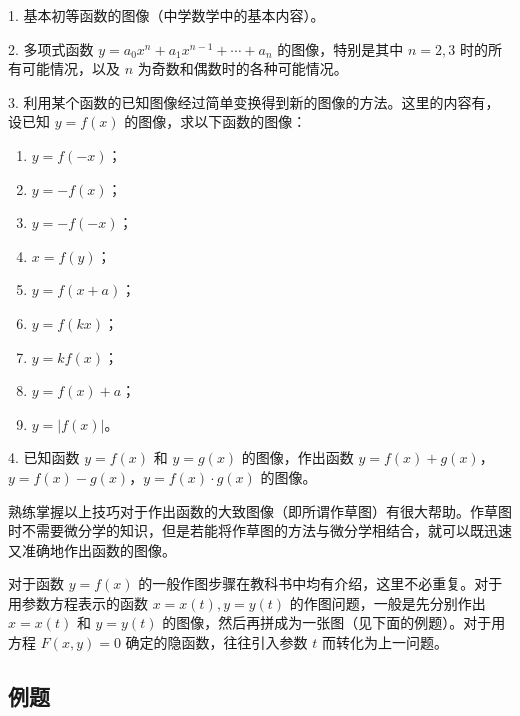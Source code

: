 1. 基本初等函数的图像（中学数学中的基本内容）。

2. 多项式函数 $y=a_0x^n+a_1x^{n-1}+\cdots+a_n$ 的图像，特别是其中 $n=2,3$ 时的所有可能情况，以及 $n$ 为奇数和偶数时的各种可能情况。

3. 利用某个函数的已知图像经过简单变换得到新的图像的方法。这里的内容有，设已知 $y=f(x)$ 的图像，求以下函数的图像：
\begin{enumerate}[label=(\arabic*)]
  \item $y=f(-x)$；
  \item $y=-f(x)$；
  \item $y=-f(-x)$；
  \item $x=f(y)$；
  \item $y=f(x+a)$；
  \item $y=f(kx)$；
  \item $y=kf(x)$；
  \item $y=f(x)+a$；
  \item $y=|f(x)|$。
\end{enumerate}

4. 已知函数 $y=f(x)$ 和 $y=g(x)$ 的图像，作出函数 $y=f(x)+g(x)$，$y=f(x)-g(x)$，$y=f(x)\cdot g(x)$ 的图像。

\begin{xremark}
熟练掌握以上技巧对于作出函数的大致图像（即所谓作草图）有很大帮助。作草图时不需要微分学的知识，但是若能将作草图的方法与微分学相结合，就可以既迅速又准确地作出函数的图像。
\end{xremark}

对于函数 $y=f(x)$ 的一般作图步骤在教科书中均有介绍，这里不必重复。对于用参数方程表示的函数 $x=x(t),y=y(t)$ 的作图问题，一般是先分别作出 $x=x(t)$ 和 $y=y(t)$ 的图像，然后再拼成为一张图（见下面的例题）。对于用方程 $F(x,y)=0$ 确定的隐函数，往往引入参数 $t$ 而转化为上一问题。

\subsection{例题}

